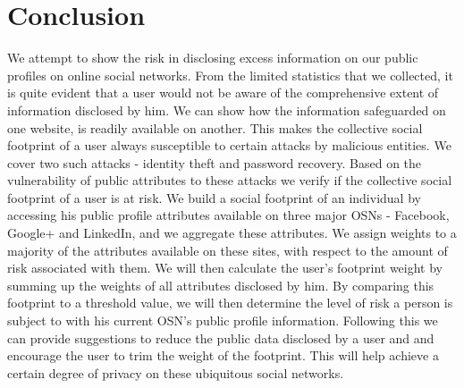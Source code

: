 \documentclass[10pt,conference]{IEEEtran}
\begin{document}
\section{Conclusion}
We attempt to show the risk in disclosing excess information on our public profiles on online social networks. From the limited statistics that we collected, it is quite evident that a user would not be aware of the comprehensive extent of information disclosed by him. We can show how the information safeguarded on one website, is readily available on another. This makes the collective social footprint of a user always susceptible to certain attacks by malicious entities. We cover two such attacks - identity theft and password recovery. Based on the vulnerability of public attributes to these attacks we verify if the collective social footprint of a user is at risk. We build a social footprint of an individual by accessing his public profile attributes available on three major OSNs - Facebook, Google+ and LinkedIn, and we aggregate these attributes. We assign weights to a majority of the attributes available on these sites, with respect to the amount of risk associated with them. We will then calculate the user's footprint weight by summing up the weights of all attributes disclosed by him. By comparing this footprint to a threshold value, we will then determine the level of risk a person is subject to with his current OSN's public profile information. Following this we can provide suggestions to reduce the public data disclosed by a user and and encourage the user to trim the weight of the footprint. This will help achieve a certain degree of privacy on these ubiquitous social networks.
\end{document}

